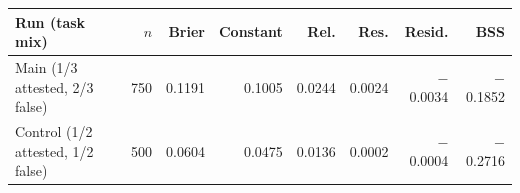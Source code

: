 \begin{tabular}{@{}lrrrrrrr@{}}
\toprule
Run (task mix) & $n$ & Brier & Constant & Rel. & Res. & Resid. & BSS \\
\midrule
Main (1/3 attested, 2/3 false) & 750 & 0.1191 & 0.1005 & 0.0244 & 0.0024 & $-$0.0034 & $-$0.1852 \\
Control (1/2 attested, 1/2 false) & 500 & 0.0604 & 0.0475 & 0.0136 & 0.0002 & $-$0.0004 & $-$0.2716 \\
\bottomrule
\end{tabular}
